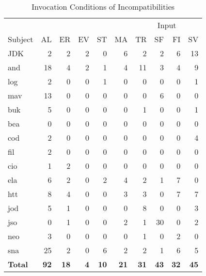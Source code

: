 \begin{table}
	\center 
	\caption{\label{table:Cond} Invocation Conditions of Incompatibilities}
	\begin{tabular}{|l|r|r|r|r|r|r|r|r|r|}
		\hline
		&        &                &             &            &              & \multicolumn{4}{c|}{Input}\\
		\cline{7-10}
Subject & AL & ER & EV & ST & MA & TR & SF & FI & SV\\
\hline
JDK & 2 & 2 & 2 & 0 & 6 & 2 & 2 & 6 & 13\\
and & 18 & 4 & 2 & 1 & 4 & 11 & 3 & 4 & 9\\
log & 2 & 0 & 0 & 1 & 0 & 0 & 0 & 0 & 1\\
mav & 13 & 0 & 0 & 0 & 0 & 0 & 6 & 0 & 0\\
buk & 5 & 0 & 0 & 0 & 0 & 1 & 0 & 0 & 1\\
bea & 0 & 0 & 0 & 0 & 0 & 0 & 0 & 0 & 0\\
cod & 2 & 0 & 0 & 0 & 0 & 0 & 0 & 0 & 4\\
fil & 2 & 0 & 0 & 0 & 0 & 0 & 0 & 0 & 0\\
cio & 1 & 2 & 0 & 0 & 0 & 0 & 0 & 0 & 0\\
ela & 6 & 2 & 0 & 2 & 4 & 2 & 1 & 7 & 0\\
htt & 8 & 4 & 0 & 0 & 3 & 3 & 0 & 7 & 7\\
jod & 5 & 1 & 0 & 0 & 0 & 8 & 0 & 0 & 3\\
jso & 0 & 1 & 0 & 0 & 2 & 1 & 30 & 0 & 2\\
neo & 3 & 0 & 0 & 0 & 0 & 1 & 0 & 2 & 0\\
sna & 25 & 2 & 0 & 6 & 2 & 2 & 1 & 6 & 5\\
\hline
\textbf{Total} & \textbf{92} & \textbf{18} & \textbf{4} & \textbf{10} & \textbf{21} & \textbf{31} & \textbf{43} & \textbf{32} & \textbf{45}\\
\hline
	\end{tabular}
		\vspace{1cm}
\end{table}
